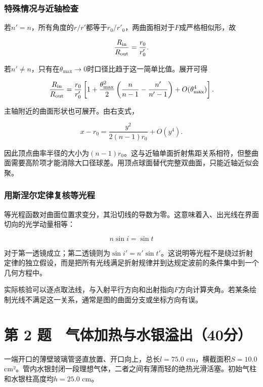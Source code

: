 \documentclass[12pt,a4paper,fontset=fandol]{ctexart}
\begin{document}
\subsubsection{特殊情况与近轴检查}\label{ux7279ux6b8aux60c5ux51b5ux4e0eux8fd1ux8f74ux68c0ux67e5}

若\(n'=n\)，所有角度的\(r/r'\)都等于\(r_0/r'_0\)，两曲面相对于\(F\)成严格相似形，故

\[
\frac{R_{\rm in}}{R_{\rm out}}=\frac{r_0}{r'_0}.
\]

若\(n'\neq n\)，只有在\(\theta_{\max}\to0\)时口径比趋于这一简单比值。展开可得

\[
\frac{R_{\rm in}}{R_{\rm out}}
=\frac{r_0}{r'_0}
\left[1+\frac{\theta_{\max}^2}{2}
\left(\frac n{n-1}-\frac{n'}{n'-1}\right)
+O(\theta_{\max}^4)\right].
\]

主轴附近的曲面形状也可展开。由右支式，

\[
x-r_0=\frac{y^2}{2(n-1)r_0}+O(y^4).
\]

因此顶点曲率半径的大小为\((n-1)r_0\)。这与近轴单面折射焦距关系相符，但整曲面需要高阶项才能消除大口径球差。用顶点球面替代完整双曲面，只能近轴近似会聚。

\subsubsection{用斯涅尔定律复核等光程}\label{ux7528ux65afux6d85ux5c14ux5b9aux5f8bux590dux6838ux7b49ux5149ux7a0b}

等光程函数对曲面位置求变分，其沿切线的导数为零。这意味着入、出光线在界面切向的光学动量相等：

\[
n\sin i=\sin t
\]

对于第一透镜成立；第二透镜则为\(\sin i'=n'\sin t'\)。这说明等光程不是绕过折射定律的独立假设，而是把所有光线满足折射规律并到达规定波前的条件集中到一个几何方程中。

实际核验可以逐点取法线，与入射平行方向和出射指向\(F\)方向计算夹角。若某条绘制光线不满足这一关系，通常是图的曲面分支或坐标方向有误。

\clearpage

\section{第 2
题　气体加热与水银溢出（40分）}\label{ux7b2c-2-ux9898-ux6c14ux4f53ux52a0ux70edux4e0eux6c34ux94f6ux6ea2ux51fa40ux5206}

一端开口的薄壁玻璃管竖直放置、开口向上，总长\(l=75.0\)
cm，横截面积\(S=10.0\)
cm²。管内水银封闭一段理想气体，二者之间有薄而轻的绝热光滑活塞。初始气柱和水银柱高度均\(h=25.0\)
cm。
\end{document}
